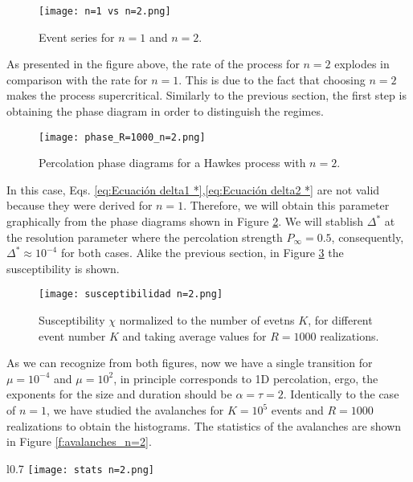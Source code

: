 \begin{figure}[H]
    \centering
    \texttt{[image: n=1 vs n=2.png]}
    \caption{Event series for $n=1$ and $n=2$.}
    \label{f:n=1 vs n=2}
\end{figure}

As presented in the figure above, the rate of the process for $n=2$ explodes in comparison with the rate for $n=1$. This is due to the fact that choosing $n=2$ makes the process supercritical.
Similarly to the previous section, the first step is obtaining the phase diagram in order to distinguish the regimes. 

\begin{figure}[H]
    \centering
    \texttt{[image: phase\_R=1000\_n=2.png]}
    \caption{Percolation phase diagrams for a Hawkes process with $n=2$.}
    \label{f:phase_diagram_n=2}
\end{figure}
In this case, Eqs. \ref{eq:Ecuación delta1 *},\ref{eq:Ecuación delta2 *} are not valid because they were derived for $n=1$. 
Therefore, we will obtain this parameter graphically from the phase diagrams shown in Figure \ref{f:phase_diagram_n=2}. We will stablish $\Delta^*$ at the resolution parameter where the
percolation strength $P_{\infty} = 0.5$, consequently, $\Delta^*\approx 10^{-4}$ for both cases. Alike the previous section, in Figure \ref{f:susceptibilidad_n=2} the susceptibility is shown.

\begin{figure}[H]
    \centering
    \texttt{[image: susceptibilidad n=2.png]}
    \caption{Susceptibility $\chi$ normalized to the number of evetns $K$, for different event number $K$ and taking average values for $R=1000$ realizations.}
    \label{f:susceptibilidad_n=2}
\end{figure}


As we can recognize from both figures, now we have a single transition for $\mu=10^{-4}$ and $\mu=10^2$, in principle corresponds to 1D percolation, ergo, 
the exponents for the size and duration should be $\alpha=\tau=2$. Identically to the case of $n=1$, we have studied the avalanches for $K=10^5$ events and $R=1000$ realizations to 
obtain the histograms. The statistics of the avalanches are shown in Figure \ref{f:avalanches_n=2}.

\begin{wrapfigure}{l}{0.7\textwidth}
      \texttt{[image: stats n=2.png]}
    \caption{Avalanche statistics for a self-exciting Hawkes process with $n=2$ for $K=10^5$ events. The histograms have been calculated over $R=1000$ time series.}
    \label{f:avalanches_n=2}
\end{wrapfigure}

